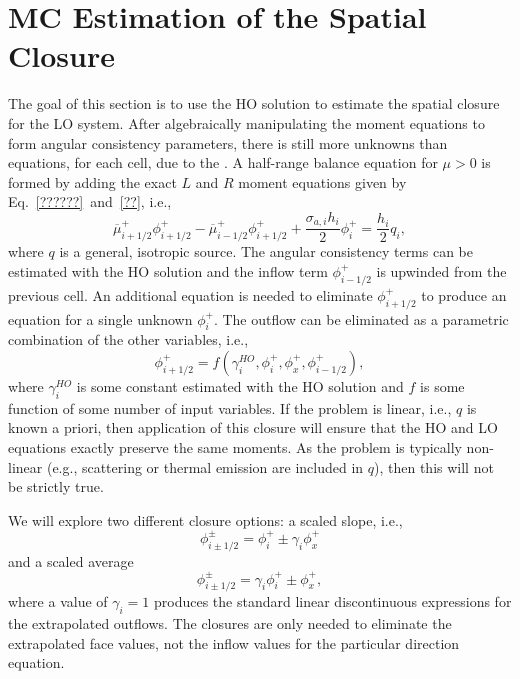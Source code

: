 \section{MC Estimation of the Spatial Closure}

The goal of this section is to use the HO solution to estimate the spatial closure for the
LO system. After algebraically manipulating the moment equations to form angular
consistency parameters, there is still more unknowns than equations, for each cell, due to
the .  A half-range balance equation for $\mu>0$ is formed by adding the
exact $L$ and
$R$ moment equations given by Eq.~\eqref{??????}~and~\eqref{??}, i.e.,
\begin{equation}
    \overline\mu^+_{i+1/2}\phi_{i+1/2}^+ - \overline\mu^+_{i-1/2}\phi_{i+1/2}^+ +
    \frac{\sigma_{a,i}h_i}{2} \phi_i^+ = \frac{h_i}{2} q_i,
\end{equation}
where $q$ is a general, isotropic source.  The angular consistency terms can be estimated
with the HO solution and the inflow term $\phi_{i-1/2}^+$ is upwinded from the previous
cell.  An additional equation is needed to eliminate $\phi_{i+1/2}^+$ to produce an
equation for a single unknown $\phi_{i}^+$.  The outflow can be eliminated as a parametric combination of the
other variables, i.e.,
\begin{equation}
    \phi_{i+1/2}^+ = f(\gamma^{HO}_i, \phi_i^+, \phi_x^+, \phi_{i-1/2}^+),
\end{equation}
where $\gamma^{HO}_i$ is some constant estimated with the HO solution and $f$ is some function of some number of input
variables. If the problem is linear, i.e., $q$ is known a priori, then application of this
closure will ensure that the HO and LO equations exactly preserve the same moments.  As
the problem is typically non-linear (e.g., scattering or thermal emission are included in
$q$), then this will not be strictly true.


We will
explore two different closure options: a scaled slope, i.e.,
\begin{equation}
    \phi_{i\pm1/2}^\pm = \phi_i^+ \pm \gamma_i \phi_x^+
\end{equation}
and a scaled average
\begin{equation}
    \phi_{i\pm1/2}^\pm = \gamma_i \phi_i^+ \pm \phi_x^+,
\end{equation}
where a value of $\gamma_i = 1$ produces the standard linear discontinuous expressions for
the extrapolated outflows.  The 
closures are only needed to eliminate the extrapolated face values, not the inflow values
for the particular direction equation.

